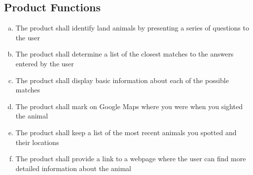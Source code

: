 \documentclass[]{article}
\begin{document}
\subsection{Product Functions}
\label{sub:product_functions}
\begin{enumerate}[a)]
	\item The product shall identify land animals by presenting a series of questions to the user
	\item The product shall determine a list of the closest matches to the answers entered by the user
	\item The product shall display basic information about each of the possible matches
	\item The product shall mark on Google Maps where you were when you sighted the animal
	\item The product shall keep a list of the most recent animals you spotted and their locations
	\item The product shall provide a link to a webpage where the user can find more detailed information about the animal
\end{enumerate}

\cbstart
\end{document}
